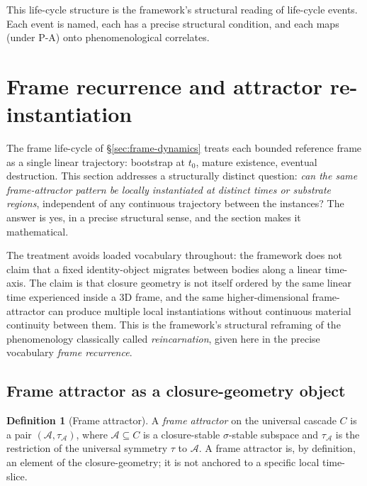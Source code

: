 \documentclass[11pt]{article}
\theoremstyle{plain}
\theoremstyle{definition}
\newtheorem{definition}[theorem]{Definition}
\theoremstyle{remark}
\begin{document}
This life-cycle structure is the framework's structural reading of life-cycle events. Each event is named, each has a precise structural condition, and each maps (under P-A) onto phenomenological correlates.

\section{Frame recurrence and attractor re-instantiation}\label{sec:frame-recurrence}

The frame life-cycle of \S\ref{sec:frame-dynamics} treats each bounded reference frame as a single linear trajectory: bootstrap at $t_0$, mature existence, eventual destruction. This section addresses a structurally distinct question: \emph{can the same frame-attractor pattern be locally instantiated at distinct times or substrate regions}, independent of any continuous trajectory between the instances? The answer is yes, in a precise structural sense, and the section makes it mathematical.

The treatment avoids loaded vocabulary throughout: the framework does not claim that a fixed identity-object migrates between bodies along a linear time-axis. The claim is that closure geometry is not itself ordered by the same linear time experienced inside a 3D frame, and the same higher-dimensional frame-attractor can produce multiple local instantiations without continuous material continuity between them. This is the framework's structural reframing of the phenomenology classically called \emph{reincarnation}, given here in the precise vocabulary \emph{frame recurrence}.

\subsection{Frame attractor as a closure-geometry object}

\begin{definition}[Frame attractor]\label{def:frame-attractor}
A \emph{frame attractor} on the universal cascade $C$ is a pair $(\mathcal{A}, \tau_\mathcal{A})$, where $\mathcal{A} \subseteq C$ is a closure-stable $\sigma$-stable subspace and $\tau_\mathcal{A}$ is the restriction of the universal symmetry $\tau$ to $\mathcal{A}$. A frame attractor is, by definition, an element of the closure-geometry; it is not anchored to a specific local time-slice.
\end{definition}
\end{document}
